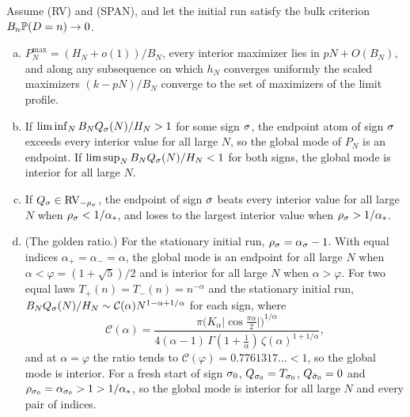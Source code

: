 \begin{introtheorem}\label{thm:mode}
Assume (RV) and (SPAN), and let the initial run satisfy the bulk criterion
$B_n\mathbb{P}(D=n)\to0$.
\begin{enumerate}[(a)]
\item $P^{\max}_N=(H_N+o(1))/B_N$, every interior maximizer lies in $pN+O(B_N)$, and
along any subsequence on which $h_N$ converges uniformly the scaled maximizers
$(k-pN)/B_N$ converge to the set of maximizers of the limit profile.
\item If $\liminf_NB_NQ_\sigma(N)/H_N>1$ for some sign $\sigma$, the endpoint atom of
sign $\sigma$ exceeds every interior value for all large $N$, so the global mode
of $P_N$ is an endpoint. If $\limsup_NB_NQ_\sigma(N)/H_N<1$ for both signs, the
global mode is interior for all large $N$.
\item If $Q_\sigma\in\mathrm{RV}_{-\rho_\sigma}$, the endpoint of sign $\sigma$ beats every
interior value for all large $N$ when $\rho_\sigma<1/\alpha_*$, and loses to the
largest interior value when $\rho_\sigma>1/\alpha_*$.
\item (The golden ratio.) For the stationary initial run,
$\rho_\sigma=\alpha_\sigma-1$. With equal indices $\alpha_\plus=\alpha_\minus=\alpha$,
the global mode is an endpoint for all large $N$ when $\alpha<\varphi=(1+\sqrt5)/2$
and is interior for all large $N$ when $\alpha>\varphi$. For two equal laws
$T_\plus(n)=T_\minus(n)=n^{-\alpha}$ and the stationary initial run,
$B_NQ_\sigma(N)/H_N\sim\mathcal C(\alpha)N^{1-\alpha+1/\alpha}$ for each sign, where
\begin{equation}\label{eq:Calpha}
 \mathcal C(\alpha)=\frac{\pi\bigl(K_\alpha\lvert\cos\frac{\pi\alpha}2\rvert\bigr)^{1/\alpha}}
 {4(\alpha-1)\,\Gamma(1+\frac1\alpha)\,\zeta(\alpha)^{1+1/\alpha}} ,
\end{equation}
and at $\alpha=\varphi$ the ratio tends to $\mathcal C(\varphi)=0.7761317\ldots<1$, so the
global mode is interior. For a fresh start of sign $\sigma_0$,
$Q_{\sigma_0}=T_{\sigma_0}$, $Q_{\bar\sigma_0}=0$ and $\rho_{\sigma_0}=\alpha_{\sigma_0}>1>1/\alpha_*$,
so the global mode is interior for all large $N$ and every pair of indices.
\end{enumerate}
\end{introtheorem}

